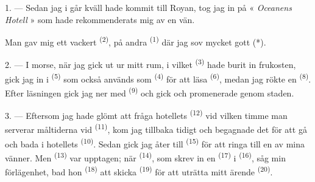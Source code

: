 %


\VUsaut{3.0mm}
\VUsaut{1.6mm}
\VUsaut{2.0mm}
\VUsaut{3.4mm}

1. --- Sedan jag i går kväll hade kommit till Royan, tog jag in på « \textit{Oceanens Hotell}
» som hade rekommenderats mig av en vän.

Man gav mig ett vackert  \textsuperscript{(2)}, på andra
 \textsuperscript{(1)} där jag sov mycket gott (*).

2. --- I morse, när jag gick ut ur mitt rum, i vilket 
\textsuperscript{(3)} hade burit in frukosten, gick jag in i 
\textsuperscript{(5)} som också används som  \textsuperscript{(4)} för att läsa
 \textsuperscript{(6)}, medan jag rökte en 
\textsuperscript{(8)}. Efter läsningen gick jag ner med  \textsuperscript{(9)}
och gick och promenerade genom staden.

3. --- Eftersom jag hade glömt att fråga hotellets  \textsuperscript{(12)}
vid vilken timme man serverar måltiderna vid
 \textsuperscript{(11)}, kom jag tillbaka tidigt och
begagnade det för att gå och bada i hotellets  \textsuperscript{(10)}. Sedan
gick jag åter till  \textsuperscript{(15)} för att ringa till en av mina
vänner. Men  \textsuperscript{(13)} var upptagen; när 
\textsuperscript{(14)}, som skrev in en  \textsuperscript{(17)} i
 \textsuperscript{(16)}, såg min förlägenhet, bad hon
 \textsuperscript{(18)} att skicka 
\textsuperscript{(19)} för att uträtta mitt ärende  \textsuperscript{(20)}.

